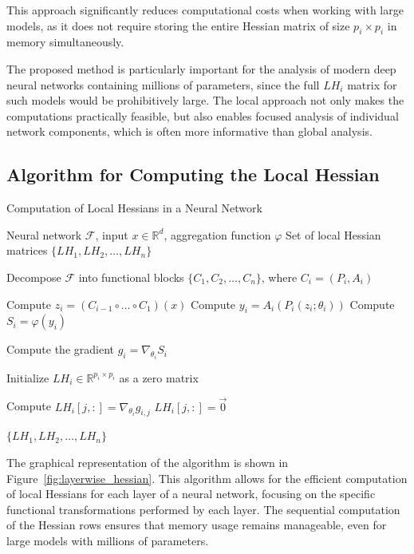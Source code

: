 \documentclass[a4paper,12pt]{article}
\begin{document}
This approach significantly reduces computational costs when working with large models, as it does not require
storing the entire Hessian matrix of size $p_i \times p_i$ in memory simultaneously.

The proposed method is particularly important for the analysis of modern deep neural networks containing millions
of parameters, since the full $LH_i$ matrix for such models would be prohibitively large.
The local approach not only makes the computations practically feasible, but also enables focused analysis of individual
network components, which is often more informative than global analysis.

\subsection{Algorithm for Computing the Local Hessian}

\begin{algorithm}
  \caption{Computation of Local Hessians in a Neural Network}
  \begin{algorithmic}[1]
    \Require Neural network $\mathcal{F}$, input $x \in \mathbb{R}^d$, aggregation function $\varphi$
    \Ensure Set of local Hessian matrices $\{LH_1, LH_2, \ldots, LH_n\}$

    \State Decompose $\mathcal{F}$ into functional blocks $\{C_1, C_2, \ldots, C_n\}$, where $C_i = (P_i, A_i)$

    \State Compute $z_i = (C_{i-1} \circ \ldots \circ C_1)(x)$ 
    \State Compute $y_i = A_i(P_i(z_i; \theta_i))$ 
    \State Compute $S_i = \varphi(y_i)$ 

    \State Compute the gradient $g_i = \nabla_{\theta_i} S_i$

    \State Initialize $LH_i \in \mathbb{R}^{p_i \times p_i}$ as a zero matrix

    \State Compute $LH_i[j,:] = \nabla_{\theta_i} g_{i,j}$
    \Else
    \State $LH_i[j,:] = \vec{0}$
    \EndIf
    \EndFor
    \EndFor

    \State \Return $\{LH_1, LH_2, \ldots, LH_n\}$
  \end{algorithmic}
\end{algorithm}

The graphical representation of the algorithm is shown in Figure~\ref{fig:layerwise_hessian}. This algorithm allows for
the efficient computation of local Hessians for each layer of a neural network, focusing on the specific
functional transformations performed by each layer. The sequential computation of the Hessian rows ensures that
memory usage remains manageable, even for large models with millions of parameters.
\end{document}

